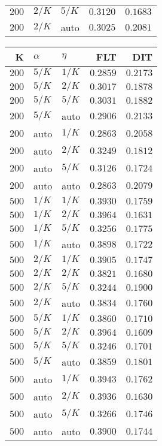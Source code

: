 \begin{table}
\begin{spacing}{1.2}
{\begin{tabular}{rll|rr}
$200$ &  $2/K$ &  $5/K$ &         $0.3120$ & $0.1683$ \\
$200$ &  $2/K$ &   auto &         $0.3025$ & $0.2081$ \\
\bottomrule
\end{tabular}
} \hfill \parbox{.45\linewidth}{\centering \begin{tabular}{rll|rr}
\toprule
    K &  $\alpha$ &    $\eta$ & FLT &        DIT \\
\midrule
$200$ &  $5/K$ &  $1/K$ &         $0.2859$ & $\bm{0.2173}$ \\
$200$ &  $5/K$ &  $2/K$ &         $0.3017$ &      $0.1878$ \\
$200$ &  $5/K$ &  $5/K$ &         $0.3031$ &      $0.1882$ \\
$200$ &  $5/K$ &   auto &         $0.2906$ &      $0.2133$ \\
$200$ &   auto &  $1/K$ &         $0.2863$ &      $0.2058$ \\
$200$ &   auto &  $2/K$ &         $0.3249$ &      $0.1812$ \\
$200$ &   auto &  $5/K$ &         $0.3126$ &      $0.1724$ \\
$200$ &   auto &   auto &         $0.2863$ &      $0.2079$ \\
$500$ &  $1/K$ &  $1/K$ &         $0.3930$ &      $0.1759$ \\
$500$ &  $1/K$ &  $2/K$ &    $\bm{0.3964}$ &      $0.1631$ \\
$500$ &  $1/K$ &  $5/K$ &         $0.3256$ &      $0.1775$ \\
$500$ &  $1/K$ &   auto &         $0.3898$ &      $0.1722$ \\
$500$ &  $2/K$ &  $1/K$ &         $0.3905$ &      $0.1747$ \\
$500$ &  $2/K$ &  $2/K$ &         $0.3821$ &      $0.1680$ \\
$500$ &  $2/K$ &  $5/K$ &         $0.3244$ &      $0.1900$ \\
$500$ &  $2/K$ &   auto &         $0.3834$ &      $0.1760$ \\
$500$ &  $5/K$ &  $1/K$ &         $0.3860$ &      $0.1710$ \\
$500$ &  $5/K$ &  $2/K$ &         $0.3964$ &      $0.1609$ \\
$500$ &  $5/K$ &  $5/K$ &         $0.3246$ &      $0.1701$ \\
$500$ &  $5/K$ &   auto &         $0.3859$ &      $0.1801$ \\
$500$ &   auto &  $1/K$ &         $0.3943$ &      $0.1762$ \\
$500$ &   auto &  $2/K$ &         $0.3936$ &      $0.1630$ \\
$500$ &   auto &  $5/K$ &         $0.3266$ &      $0.1746$ \\
$500$ &   auto &   auto &         $0.3900$ &      $0.1744$ \\
\bottomrule
\end{tabular}
}
\end{spacing}
\end{table}
